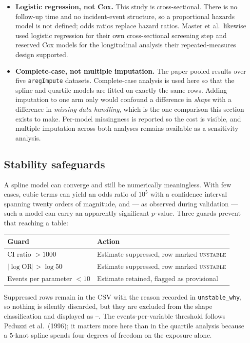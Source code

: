 \documentclass[11pt]{article}
\newcommand{\code}[1]{\texttt{\small #1}}
\begin{document}
\begin{itemize}
\item \textbf{Logistic regression, not Cox.} This study is cross-sectional.
There is no follow-up time and no incident-event structure, so a proportional
hazards model is not defined; odds ratios replace hazard ratios. Master et al.\
likewise used logistic regression for their own cross-sectional screening step
and reserved Cox models for the longitudinal analysis their repeated-measures
design supported.
\item \textbf{Complete-case, not multiple imputation.} The paper pooled results
over five \code{aregImpute} datasets. Complete-case analysis is used here so
that the spline and quartile models are fitted on exactly the same rows. Adding
imputation to one arm only would confound a difference in \emph{shape} with a
difference in \emph{missing-data handling}, which is the one comparison this
section exists to make. Per-model missingness is reported so the cost is visible,
and multiple imputation across both analyses remains available as a sensitivity
analysis.
\end{itemize}

\subsection{Stability safeguards} A spline model can converge and still be
numerically meaningless. With few cases, cubic terms can yield an odds ratio of
$10^5$ with a confidence interval spanning twenty orders of magnitude, and --- as
observed during validation --- such a model can carry an apparently significant
$p$-value. Three guards prevent that reaching a table:

\begin{table}[h]
\centering
\begin{tabular}{@{}l p{8.4cm}@{}}
\toprule
\textbf{Guard} & \textbf{Action} \\
\midrule
CI ratio $>1000$ & Estimate suppressed, row marked \textsc{unstable} \\
$\lvert \log \mathrm{OR}\rvert > \log 50$ & Estimate suppressed, row marked \textsc{unstable} \\
Events per parameter $<10$ & Estimate retained, flagged as provisional \\
\bottomrule
\end{tabular}
\end{table}

\noindent Suppressed rows remain in the CSV with the reason recorded in
\code{unstable\_why}, so nothing is silently discarded, but they are excluded
from the shape classification and displayed as \code{--}. The events-per-variable
threshold follows Peduzzi et al.\ (1996); it matters more here than in the
quartile analysis because a 5-knot spline spends four degrees of freedom on the
exposure alone.
\end{document}
